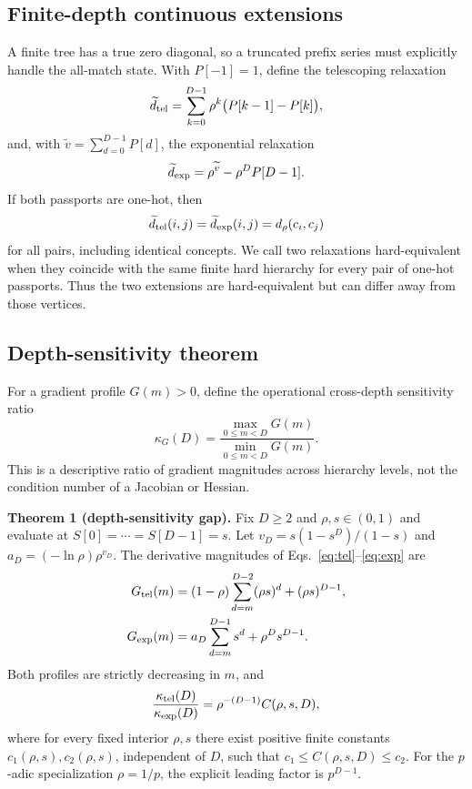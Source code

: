 \documentclass[preprint,11pt]{elsarticle}
\begin{document}
\subsection{Finite-depth continuous extensions}
A finite tree has a true zero diagonal, so a truncated prefix series must explicitly handle the all-match state. With $P[-1]=1$, define the telescoping relaxation
\begin{equation}
 \widetilde d_{\rm tel}=\sum_{k=0}^{D-1}\rho^k\bigl(P[k-1]-P[k]\bigr),
 \label{eq:tel}
\end{equation}
and, with $\widetilde v=\sum_{d=0}^{D-1}P[d]$, the exponential relaxation
\begin{equation}
 \widetilde d_{\rm exp}=\rho^{\widetilde v}-\rho^D P[D-1].
 \label{eq:exp}
\end{equation}
If both passports are one-hot, then
\begin{equation}
 \widetilde d_{\rm tel}(i,j)=\widetilde d_{\rm exp}(i,j)=d_\rho(c_i,c_j)
 \label{eq:hardexact}
\end{equation}
for all pairs, including identical concepts. We call two relaxations hard-equivalent when they coincide with the same finite hard hierarchy for every pair of one-hot passports. Thus the two extensions are hard-equivalent but can differ away from those vertices.

\subsection{Depth-sensitivity theorem}
For a gradient profile $G(m)>0$, define the operational cross-depth sensitivity ratio
\begin{equation}
 \kappa_G(D)=\frac{\max_{0\leq m<D}G(m)}{\min_{0\leq m<D}G(m)}.
 \label{eq:kappa}
\end{equation}
This is a descriptive ratio of gradient magnitudes across hierarchy levels, not the condition number of a Jacobian or Hessian.

\textbf{Theorem 1 (depth-sensitivity gap).} Fix $D\geq2$ and $\rho,s\in(0,1)$ and evaluate at $S[0]=\cdots=S[D-1]=s$. Let $v_D=s(1-s^D)/(1-s)$ and $a_D=(-\ln\rho)\rho^{v_D}$. The derivative magnitudes of Eqs.~\eqref{eq:tel}--\eqref{eq:exp} are
\begin{align}
 G_{\rm tel}(m)&=(1-\rho)\sum_{d=m}^{D-2}(\rho s)^d+(\rho s)^{D-1},\\
 G_{\rm exp}(m)&=a_D\sum_{d=m}^{D-1}s^d+\rho^D s^{D-1}.
\end{align}
Both profiles are strictly decreasing in $m$, and
\begin{equation}
 \frac{\kappa_{\rm tel}(D)}{\kappa_{\rm exp}(D)}=\rho^{-(D-1)}C(\rho,s,D),
 \label{eq:gap}
\end{equation}
where for every fixed interior $\rho,s$ there exist positive finite constants $c_1(\rho,s),c_2(\rho,s)$, independent of $D$, such that $c_1\leq C(\rho,s,D)\leq c_2$. For the $p$-adic specialization $\rho=1/p$, the explicit leading factor is $p^{D-1}$.
\end{document}
